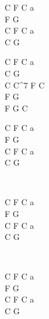 \begin{chord}
    C F C a\\
    F G\\
    C F C a\\
    C G
	
    C F C a\\
    C G \\
    C C^7 F C\\
    F G \\
    F G C 
    
    C F C a\\
    F G\\
    C F C a\\
    C G
    
    ~
    
    C F C a\\
    F G\\
    C F C a\\
    C G
    
    ~
    
    C F C a\\
    F G\\
    C F C a\\
    C G
\end{chord}